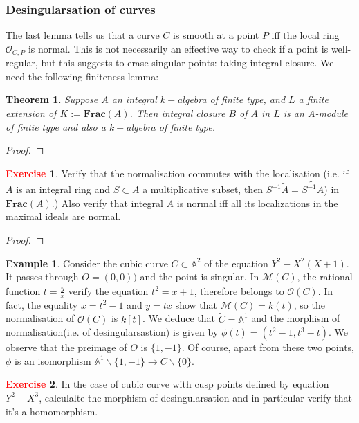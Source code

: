 \documentclass[12pt,a4paper,english]{article}
\theoremstyle{plain}
\newtheorem{thm}{Theorem}[section]
\theoremstyle{definition}
\newtheorem*{example}{Example}
\newtheorem{exercise}{\textbf{\textcolor{red}{Exercise}}}
\theoremstyle{remark}
\newcommand{\Frac}{\mathbf{Frac}}
\begin{document}
\subsubsection{Desingularsation of curves}
The last lemma tells us that a curve $C$ is smooth at a point $P$ iff the local ring $\mathcal{O}_{C,P}$ is normal. This is not necessarily an effective way to check if a point is well-regular, but this suggests to erase singular points: taking integral closure. We need the following finiteness lemma:
\begin{thm}
Suppose $A$ an integral $k-$algebra of finite type, and $L$ a finite extension of $K:=\Frac(A)$. Then integral closure $B$ of $A$ in $L$ is an $A$-module of fintie type and also a $k-$algebra of finite type. 
\end{thm}
\begin{proof}

\end{proof}
\begin{exercise}
Verify that the normalisation commutes with the localisation (i.e. if $A$ is an integral ring and $S\subset A$ a multiplicative subset, then $S^{-1}\tilde{A}=\widetilde{S^{-1}A}$) in $\Frac(A)$.) Also verify that integral $A$ is normal iff all its localizations in the maximal ideals are normal.
\end{exercise}
\begin{tcolorbox}
\begin{proof}

\end{proof}
\end{tcolorbox}
\begin{example}
Consider the cubic curve $C\subset\mathbb{A}^{2}$ of the equation $Y^{2}-X^{2}(X+1)$. It passes through $O=(0,0))$ and the point is singular. In $\mathcal{M}(C)$, the rational function $t=\frac{y}{x}$ verify the equation $t^{2}=x+1$, therefore belongs to $\widetilde{\mathcal{O}(C)}$. In fact, the equality $x=t^{2}-1$ and $y=tx$ show that $\mathcal{M}(C)=k(t)$, so the normalisation of $\mathcal{O}(C)$ is $k[t]$. We deduce that $\widetilde{C}=\mathbb{A}^{1}$ and the morphism of normalisation(i.e. of desingularsastion) is given by $\phi(t)=(t^{2}-1,t^{3}-t)$. We observe that the preimage of $O$ is $\{1,-1\}$. Of course, apart from these two points, $\phi$ is an isomorphism $\mathbb{A}^{1}\backslash\{1,-1\}\rightarrow  C\backslash\{0\}$. 
\end{example}
\begin{exercise}
In the case of cubic curve with cusp points defined by equation $Y^{2}-X^{3}$, calculalte the morphism of desingularsation and in particular verify that it's a homomorphism.
\end{exercise}
\end{document}
